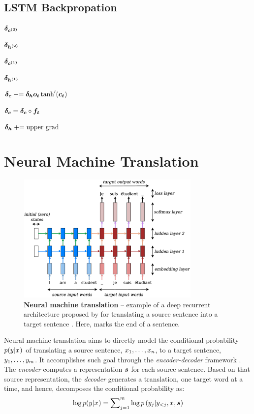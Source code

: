 \subsection{LSTM Backpropation}
$\mbox{\boldmath{$\delta_{c^{(2)}}$}}$

$\mbox{\boldmath{$\delta_{h^{(2)}}$}}$

$\mbox{\boldmath{$\delta_{c^{(1)}}$}}$

$\mbox{\boldmath{$\delta_{h^{(1)}}$}}$

$\mbox{\boldmath{$\delta_{c}$}} \mathrel{+}= \mbox{\boldmath{$\delta_{h}$}}\mbox{\boldmath{$o_t$}}\tanh'(\mbox{\boldmath{$c_t$}}) $

$\mbox{\boldmath{$\delta_{c}$}} = \mbox{\boldmath{$\delta_{c}$}} \circ \mbox{\boldmath{$f_t$}} $

$\mbox{\boldmath{$\delta_{h}$}} \mathrel{+}= \text{upper grad}$


\section{Neural Machine Translation}
\begin{figure}[tbh!]
\centering
\includegraphics[width=0.8\textwidth, clip=true, trim= 0 0 0
0]{img/nmt_very_details.eps} %
\caption[Neural machine translation]{{\bf Neural machine translation} -- example of a deep recurrent
architecture proposed by  for
translating a source sentence  into a target sentence
. Here, \word{\texttt{\_}} marks the end of a sentence.
} 
\label{f:nmt_details}
\end{figure}


Neural machine translation aims to directly model the conditional probability $p(y_{}|x_{})$ of translating
a source sentence, $x_{1},\ldots,x_{n}$, to a target sentence, $y_{1},\ldots,y_{m}$.
It accomplishes such goal through the {\it encoder-decoder} framework \cite{sutskever14,cho14}. The {\it encoder} computes a representation $\mbox{\boldmath{$s$}}$
for each source sentence. Based on that source representation,
the {\it decoder} generates a translation, one target word at a time, and hence, decomposes the conditional probability as:
\begin{equation}
\log p(y_{}|x_{}) = \sum_{j=1}^m \nolimits \log
p\left(y_{j}|y_{<j},x_{},\mbox{\boldmath{$s$}}\right)
\end{equation}

